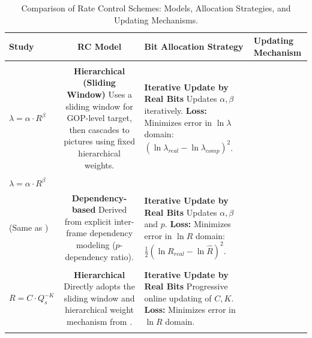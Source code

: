 \begin{table}[!h] 
\centering
\caption{Comparison of Rate Control Schemes: Models, Allocation Strategies, and Updating Mechanisms.}
\label{tab:rc_theory_comparison}
\small
\renewcommand{\arraystretch}{1.5} %

\begin{tabularx}{\textwidth}{@{} l c >{\raggedright\arraybackslash}X >{\raggedright\arraybackslash}X @{}}
\toprule
\textbf{Study} & \textbf{RC Model} & \textbf{Bit Allocation Strategy} & \textbf{Updating Mechanism} \\ \midrule

\cite{50} & 
\makecell[t]{\rule{0pt}{3ex}$R$-$\lambda$ Model \\ $\lambda = \alpha \cdot R^{\beta}$} & 
\textbf{Hierarchical (Sliding Window)} \newline 
Uses a sliding window for GOP-level target, then cascades to pictures using fixed hierarchical weights. & 
\textbf{Iterative Update by Real Bits} \newline 
Updates $\alpha, \beta$ iteratively. \newline
\textbf{Loss:} Minimizes error in $\ln \lambda$ domain: $(\ln \lambda_{real} - \ln \lambda_{comp})^2$. \\ \addlinespace[1em] %

\cite{51} & 
\makecell[t]{\rule{0pt}{3ex}$R$-$\lambda$ Model  \\ $\lambda = \alpha \cdot R^{\beta}$ \\ (Same as \cite{50})} & 
\textbf{Dependency-based} \newline 
Derived from explicit inter-frame dependency modeling ($p$-dependency ratio). & 
\textbf{Iterative Update by Real Bits} \newline 
Updates $\alpha, \beta$ and $p$. \newline
\textbf{Loss:} Minimizes error in $\ln R$ domain:$\frac{1}{2}(\ln R_{real} - \ln \hat{R})^2$. \\ \addlinespace[1em]

\cite{52} & 
\makecell[t]{\rule{0pt}{3ex}$R$-$Q_s$ Model \\ $R = C \cdot Q_s^{-K}$} & 
\textbf{Hierarchical} \newline 
Directly adopts the sliding window and hierarchical weight mechanism from \cite{50}. & 
\textbf{Iterative Update by Real Bits} \newline 
Progressive online updating of $C, K$. \newline
\textbf{Loss:} Minimizes error in $\ln R$ domain. \\ \addlinespace[1em]


\end{tabularx}
\end{table}
